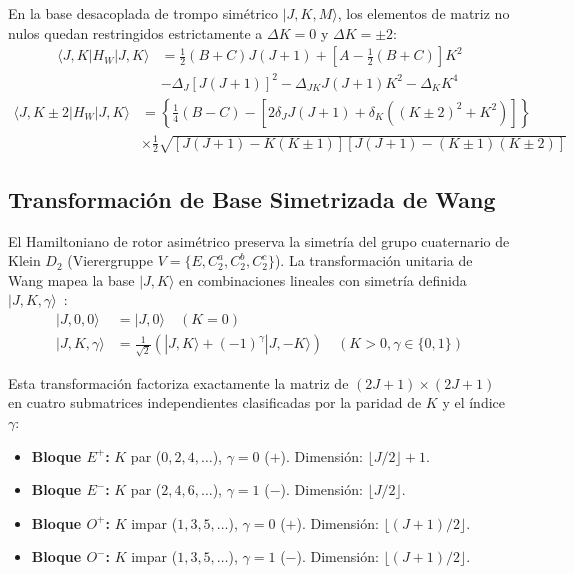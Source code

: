 \documentclass[aps,jcp,reprint,twocolumn,superscriptaddress,showpacs,amsmath,amssymb]{revtex4-2}
\begin{document}
En la base desacoplada de trompo sim\'etrico $|J, K, M\rangle$, los elementos de matriz no nulos quedan restringidos estrictamente a $\Delta K = 0$ y $\Delta K = \pm 2$:
\begin{align}
\langle J, K | H_W | J, K \rangle &= \frac{1}{2}(B+C) J(J+1) + \left[A - \frac{1}{2}(B+C)\right] K^2 \nonumber \\
&- \Delta_J [J(J+1)]^2 - \Delta_{JK} J(J+1) K^2 - \Delta_K K^4
\end{align}
\begin{align}
\langle J, K \pm 2 | H_W | J, K \rangle &= \left\{ \frac{1}{4}(B - C) - \left[2\delta_J J(J+1) + \delta_K ((K \pm 2)^2 + K^2)\right] \right\} \nonumber \\
&\times \frac{1}{2} \sqrt{[J(J+1) - K(K \pm 1)][J(J+1) - (K \pm 1)(K \pm 2)]}
\end{align}

\subsection{Transformaci\'on de Base Simetrizada de Wang}
El Hamiltoniano de rotor asim\'etrico preserva la simetr\'ia del grupo cuaternario de Klein $D_2$ (Vierergruppe $V = \{E, C_2^a, C_2^b, C_2^c\}$). La transformaci\'on unitaria de Wang mapea la base $|J, K\rangle$ en combinaciones lineales con simetr\'ia definida $|J, K, \gamma\rangle$~\cite{wang1929degree}:
\begin{align}
|J, 0, 0\rangle &= |J, 0\rangle \quad (K = 0) \\
|J, K, \gamma\rangle &= \frac{1}{\sqrt{2}} (|J, K\rangle + (-1)^\gamma |J, -K\rangle) \quad (K > 0, \gamma \in \{0, 1\})
\end{align}

Esta transformaci\'on factoriza exactamente la matriz de $(2J+1) \times (2J+1)$ en cuatro submatrices independientes clasificadas por la paridad de $K$ y el \'indice $\gamma$:
\begin{itemize}
    \item \textbf{Bloque $E^+$:} $K$ par ($0, 2, 4, \dots$), $\gamma = 0$ ($+$). Dimensi\'on: $\lfloor J/2 \rfloor + 1$.
    \item \textbf{Bloque $E^-$:} $K$ par ($2, 4, 6, \dots$), $\gamma = 1$ ($-$). Dimensi\'on: $\lfloor J/2 \rfloor$.
    \item \textbf{Bloque $O^+$:} $K$ impar ($1, 3, 5, \dots$), $\gamma = 0$ ($+$). Dimensi\'on: $\lfloor (J+1)/2 \rfloor$.
    \item \textbf{Bloque $O^-$:} $K$ impar ($1, 3, 5, \dots$), $\gamma = 1$ ($-$). Dimensi\'on: $\lfloor (J+1)/2 \rfloor$.
\end{itemize}
\end{document}
